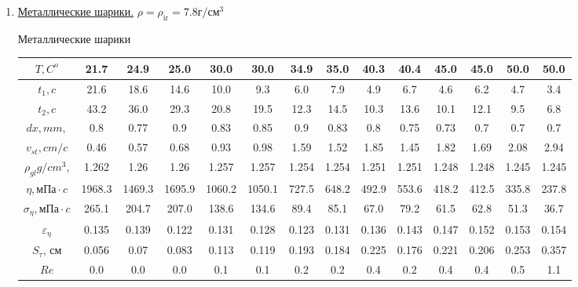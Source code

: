 \documentclass[10pt]{article}
\begin{document}
\begin{enumerate}
    \item \underline{Металлические шарики.}
        $\rho = \rho_{\text{ir}} = 7.8 \text{г}/\text{см}^3$
        \begin{table}[htp]
                    Металлические шарики\\
                    \begin{tabular}{|c|c|c|c|c|c|c|c|c|c|c|c|c|c|}
                            \hline
                                $ T , C^o$  &21.7 &24.9 &25.0 &30.0 &30.0 &34.9 &35.0 &40.3 &40.4 &45.0 &45.0 &50.0 &50.0 \\
                            \hline
                                $ t_1 , c$   &21.6 &18.6 &14.6 &10.0 &9.3 &6.0 &7.9 &4.9 &6.7 &4.6 &6.2 &4.7 &3.4 \\
                            \hline
                                $ t_2 , c$ &43.2 &36.0 &29.3 &20.8 &19.5 &12.3 &14.5 &10.3 &13.6 &10.1 &12.1 &9.5 &6.8 \\
                            \hline
                                $ dx, mm, $ &0.8 &0.77 &0.9 &0.83 &0.85 &0.9 &0.83 &0.8 &0.75 &0.73 &0.7 &0.7 &0.7 \\
                            \hline
                                $v_{st}, cm/c$ &0.46 &0.57 &0.68 &0.93 &0.98 &1.59 &1.52 &1.85 &1.45 &1.82 &1.69 &2.08 &2.94 \\
                            \hline
                                $\rho_{gl} g/cm^3$, &1.262 &1.26 &1.26 &1.257 &1.257 &1.254 &1.254 &1.251 &1.251 &1.248 &1.248 &1.245 &1.245 \\
                            \hline
                                $\eta , \text{мПа} \cdot c$ &1968.3 &1469.3 &1695.9 &1060.2 &1050.1 &727.5 &648.2 &492.9 &553.6 &418.2 &412.5 &335.8 &237.8 \\
                            \hline
                                $\sigma_{\eta} , \text{мПа} \cdot c$ &265.1 &204.7 &207.0 &138.6 &134.6 &89.4 &85.1 &67.0 &79.2 &61.5 &62.8 &51.3 &36.7 \\
                            \hline
                                $\varepsilon_{\eta}$ &0.135 &0.139 &0.122 &0.131 &0.128 &0.123 &0.131 &0.136 &0.143 &0.147 &0.152 &0.153 &0.154 \\
                            \hline
                                $S_{\tau}$, см &0.056 &0.07 &0.083 &0.113 &0.119 &0.193 &0.184 &0.225 &0.176 &0.221 &0.206 &0.253 &0.357 \\
                            \hline
                                $Re$ &0.0 &0.0 &0.0 &0.1 &0.1 &0.2 &0.2 &0.4 &0.2 &0.4 &0.4 &0.5 &1.1 \\

\end{tabular}
\end{table}
\end{enumerate}
\end{document}

